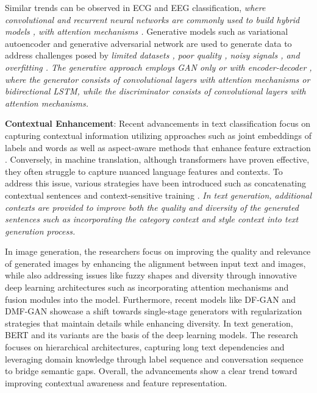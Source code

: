 \documentclass[preprint,12pt]{elsarticle}
\begin{document}
Similar trends can be observed in ECG and EEG classification, \emph{where convolutional and recurrent neural networks are commonly used to build hybrid models \citep{alamatsaz_lightweight_2024, hermawan_multi_2024}, with attention mechanisms \citep{sun_arrhythmia_2024, chen_automated_2022}.} Generative models such as variational autoencoder \citep{ dai2019eeg} and generative adversarial network are used to generate data to address challenges posed by \emph{limited datasets \citep{yang_data_2024, msigwa_iot-driven_2024, song_eeggan-net_2024}, poor quality \citep{corley_deep_2025}, noisy signals \citep{cai_dhct-gan_2025}, and overfitting \citep{zhu_electrocardiogram_2019}. The generative approach employs GAN only or with encoder-decoder \citep{yang_data_2024}, where the generator consists of convolutional layers with attention mechanisms or bidirectional LSTM, while the discriminator consists of convolutional layers with attention mechanisms.}

\textbf{Contextual Enhancement}: Recent advancements in text classification focus on capturing contextual information utilizing approaches such as joint embeddings of labels \citep{wang_joint_2018} and words as well as aspect-aware methods that enhance feature extraction \citep{zhu_bert-based_2023}. Conversely, in machine translation, although transformers have proven effective, they often struggle to capture nuanced language features and contexts. To address this issue, various strategies have been introduced such as concatenating contextual sentences and context-sensitive training \citep{wu_study_2022, kim_towards_2023}. \emph{In text generation, additional contexts are provided to improve both the quality and diversity of the generated sentences such as incorporating the category context \citep{li_feature-aware_2023} and style context \citep{kwon_class_2024} into text generation process.}

In image generation, the researchers focus on improving the quality and relevance of generated images by enhancing the alignment between input text and images, while also addressing issues like fuzzy shapes and diversity through innovative deep learning architectures such as incorporating attention mechanisms and fusion modules into the model. Furthermore, recent models like DF-GAN \citep{tao_df-gan_2022} and DMF-GAN \citep{yang_dmf-gan_2024} showcase a shift towards single-stage generators with regularization strategies that maintain details while enhancing diversity. In text generation, BERT and its variants are the basis of the deep learning models. The research focuses on hierarchical architectures, capturing long text dependencies \citep{ma_t-bertsum_2021} and leveraging domain knowledge through label sequence \citep{xie_pre-trained_2022} and conversation sequence \citep{li_incremental_2019} to bridge semantic gaps. Overall, the advancements show a clear trend toward improving contextual awareness and feature representation.
\end{document}
